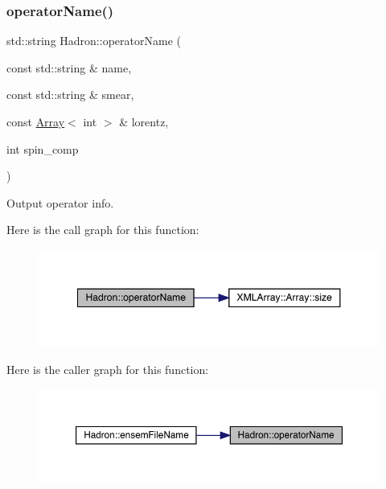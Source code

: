 \subsubsection{\texorpdfstring{operatorName()}{operatorName()}}
{\footnotesize\ttfamily std\+::string Hadron\+::operator\+Name (\begin{DoxyParamCaption}\item[{const std\+::string \&}]{name,  }\item[{const std\+::string \&}]{smear,  }\item[{const \mbox{\hyperlink{classXMLArray_1_1Array}{Array}}$<$ int $>$ \&}]{lorentz,  }\item[{int}]{spin\+\_\+comp }\end{DoxyParamCaption})}



Output operator info. 

Here is the call graph for this function\+:
\nopagebreak
\begin{figure}[H]
\begin{center}
\leavevmode
\includegraphics[width=348pt]{d1/daf/namespaceHadron_a8f8a77c02a6415ffc31d2a300f59e6a6_cgraph}
\end{center}
\end{figure}
Here is the caller graph for this function\+:
\nopagebreak
\begin{figure}[H]
\begin{center}
\leavevmode
\includegraphics[width=350pt]{d1/daf/namespaceHadron_a8f8a77c02a6415ffc31d2a300f59e6a6_icgraph}
\end{center}
\end{figure}
\mbox{\label{namespaceHadron_a8bd515c92e3dbbe8e9741b25d71edc60}} 
